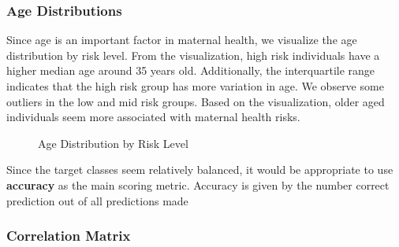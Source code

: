 \documentclass[
  letterpaper,
  DIV=11,
  numbers=noendperiod]{scrartcl}
\begin{document}
\subsubsection{Age Distributions}\label{age-distributions}

Since age is an important factor in maternal health, we visualize the
age distribution by risk level. From the visualization, high risk
individuals have a higher median age around 35 years old. Additionally,
the interquartile range indicates that the high risk group has more
variation in age. We observe some outliers in the low and mid risk
groups. Based on the visualization, older aged individuals seem more
associated with maternal health risks.

\begin{figure}


\caption{\label{fig-age-distrib}Age Distribution by Risk Level}

\end{figure}%

Since the target classes seem relatively balanced, it would be
appropriate to use \textbf{accuracy} as the main scoring metric.
Accuracy is given by the number correct prediction out of all
predictions made

\subsubsection{Correlation Matrix}\label{correlation-matrix}
\end{document}
